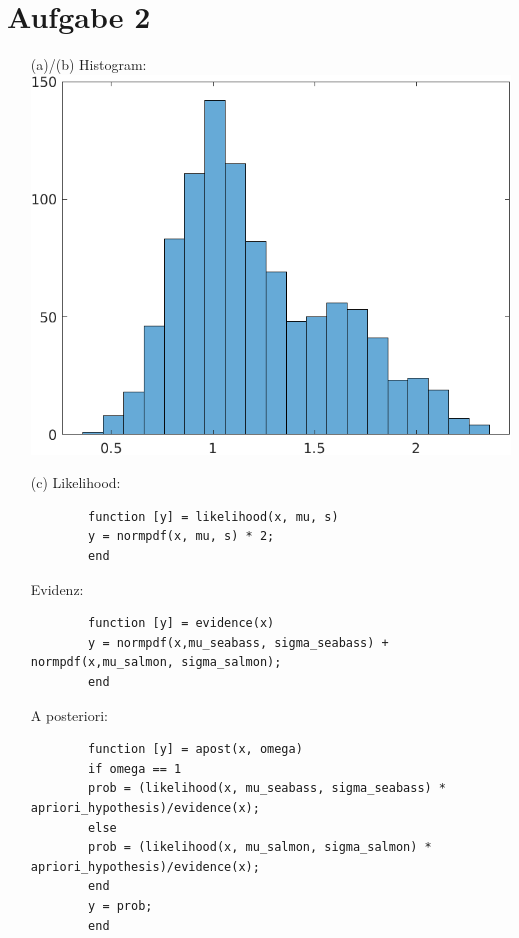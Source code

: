 \documentclass[a4paper]{scrartcl}
\begin{document}
	\section*{Aufgabe 2}
	\begin{itemize}
		\item[(a)/(b)] Histogram:\\
		\includegraphics*[scale = 0.5]{assignment2_data/plots/hist_fish.png}
		
		\item[(c)]
		Likelihood:
		\begin{lstlisting}
		function [y] = likelihood(x, mu, s)
		y = normpdf(x, mu, s) * 2;
		end
		\end{lstlisting}
		Evidenz: 
		\begin{lstlisting}
		function [y] = evidence(x)
		y = normpdf(x,mu_seabass, sigma_seabass) + normpdf(x,mu_salmon, sigma_salmon);
		end
		\end{lstlisting}
		A posteriori:
		\begin{lstlisting}
		function [y] = apost(x, omega)
		if omega == 1
		prob = (likelihood(x, mu_seabass, sigma_seabass) * apriori_hypothesis)/evidence(x);
		else
		prob = (likelihood(x, mu_salmon, sigma_salmon) * apriori_hypothesis)/evidence(x);
		end
		y = prob;
		end
		\end{lstlisting}
		

\end{itemize}
\end{document}
